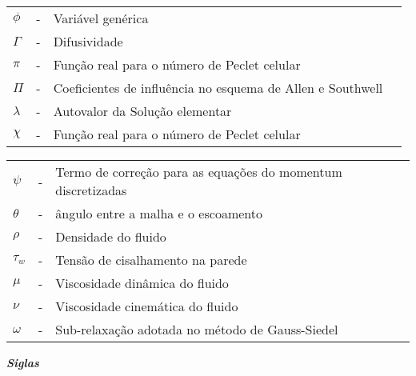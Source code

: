 \noindent
\begin{tabular}{l c p{.9\linewidth} l}
$\phi$ & - & Variável genérica\\
$\Gamma$ & - & Difusividade\\
$\pi$ & - & Função real para o número de Peclet celular\\
$\Pi$ & - & Coeficientes de influência no esquema de Allen e Southwell\\
$\lambda$ & - & Autovalor da Solução elementar\\
$\chi$ & - & Função real para o número de Peclet celular\\
\end{tabular}
\newline \newline
\begin{tabular}{l c p{.9\linewidth} l}
	$\psi$ & - & Termo de correção para as equações do momentum discretizadas\\
	$\theta$ & - & ângulo entre a malha e o escoamento\\
	$\rho$ & - & Densidade do fluido\\
	$\tau_w$ & - & Tensão de cisalhamento na parede\\
	$\mu$ & - & Viscosidade dinâmica do fluido\\
	$\nu$ & - & Viscosidade cinemática do fluido\\
	$\omega$ & - & Sub-relaxação adotada no método de Gauss-Siedel\\
\end{tabular}
\newline \newline
\textbf{\emph{Siglas}}\\

